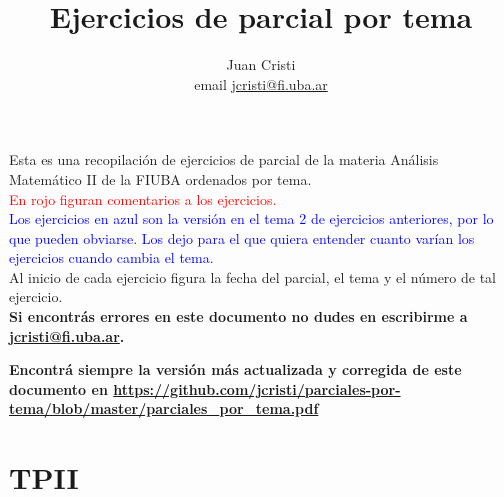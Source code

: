 \documentclass[12pt,a4paper]{article}
\author{Juan Cristi \\ email \href{mailto:jcristi@fi.uba.ar}{jcristi@fi.uba.ar}} %
\title{Ejercicios de parcial por tema}
\renewcommand{\b}[1]{\textbf{#1}}
\newcommand{\red}[1]{\textcolor{red}{#1}}
\newcommand{\blue}[1]{\textcolor{blue}{#1}}
\begin{document}
\maketitle
Esta es una recopilación de ejercicios de parcial de la materia Análisis Matemático II de la FIUBA ordenados por tema. \\

\red{En rojo figuran comentarios a los ejercicios.}\\

\blue{Los ejercicios en azul son la versión en el tema 2 de ejercicios anteriores, por lo que pueden obviarse. Los dejo para el que quiera entender cuanto varían los ejercicios cuando cambia el tema.}\\

Al inicio de cada ejercicio figura la fecha del parcial, el tema y el número de tal ejercicio.\\

\b{Si encontrás errores en este documento no dudes en escribirme a \href{mailto:jcristi@fi.uba.ar}{jcristi@fi.uba.ar}.}

\b{Encontrá siempre la versión más actualizada y corregida de este documento en \url{https://github.com/jcristi/parciales-por-tema/blob/master/parciales_por_tema.pdf}}


\section{TPII}
\end{document}
